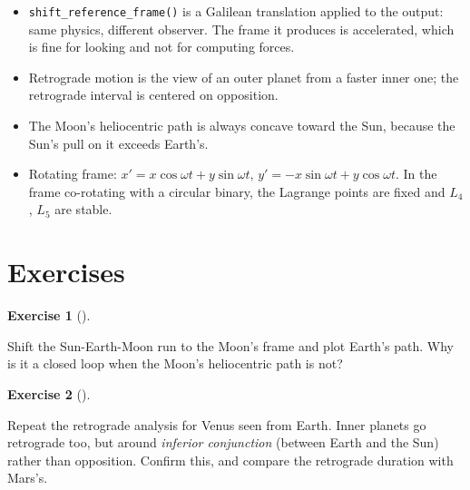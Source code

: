 \documentclass[
  10.5pt,
  letterpaper,
]{scrbook}
\providecommand{\tightlist}{%
  \setlength{\itemsep}{0pt}\setlength{\parskip}{0pt}}
\theoremstyle{definition}
\newtheorem{exercise}{Exercise}[chapter]
\theoremstyle{plain}
\theoremstyle{remark}
\begin{document}
\begin{tcolorbox}[enhanced jigsaw, arc=.35mm, bottomrule=.15mm, bottomtitle=1mm, breakable, colback=white, colbacktitle=quarto-callout-tip-color!10!white, colframe=quarto-callout-tip-color-frame, coltitle=black, left=2mm, leftrule=.75mm, opacityback=0, opacitybacktitle=0.6, rightrule=.15mm, title={Key results}, titlerule=0mm, toprule=.15mm, toptitle=1mm]

\begin{itemize}
\tightlist
\item
  \texttt{shift\_reference\_frame()} is a Galilean translation applied
  to the output: same physics, different observer. The frame it produces
  is accelerated, which is fine for looking and not for computing
  forces.
\item
  Retrograde motion is the view of an outer planet from a faster inner
  one; the retrograde interval is centered on opposition.
\item
  The Moon's heliocentric path is always concave toward the Sun, because
  the Sun's pull on it exceeds Earth's.
\item
  Rotating frame: \(x' = x\cos\omega t + y\sin\omega t\),
  \(y' = -x\sin\omega t + y\cos\omega t\). In the frame co-rotating with
  a circular binary, the Lagrange points are fixed and \(L_4\), \(L_5\)
  are stable.
\end{itemize}

\end{tcolorbox}

\section*{Exercises}\label{exercises-9}


\begin{exercise}[]\protect\hypertarget{exr-ch10-selenocentric}{}\label{exr-ch10-selenocentric}

Shift the Sun-Earth-Moon run to the Moon's frame and plot Earth's path.
Why is it a closed loop when the Moon's heliocentric path is not?

\end{exercise}

\begin{exercise}[]\protect\hypertarget{exr-ch10-venus}{}\label{exr-ch10-venus}

Repeat the retrograde analysis for Venus seen from Earth. Inner planets
go retrograde too, but around \emph{inferior conjunction} (between Earth
and the Sun) rather than opposition. Confirm this, and compare the
retrograde duration with Mars's.

\end{exercise}
\end{document}
